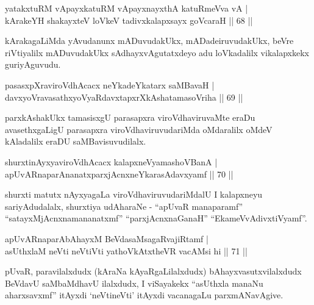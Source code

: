 \begin{shl}
yatakxtuRM vA\s payxkatuRM vA\s payxnayxthA katuRmeVva vA  | \\
kArakeYH shakayxteV loVkeV tadivxkalapxsayx goVcaraH  \hfill||  68 ||  
\end{shl}

\begin{artha}
kArakagaLiMda yAvudanunx mADuvudakUkx, mADadeiruvudakUkx, beVre riVtiyalilx mADuvudakUkx sAdhayxvAgutatxdeyo adu loVkadalilx vikalapxkekx guriyAguvudu.
\end{artha}


\begin{shl}
pasasxpXraviroVdhAcacx neYkadeYkatarx saMBavaH  | \\
davxyoVravasathxyoVyaRdavxtapxrXkAshatamasoVriha \hfill ||  69 ||  
\end{shl}

\begin{artha}
parxkAshakUkx tamasisxgU parasapxra viroVdhaviruvaMte eraDu avasethxgaLigU parasapxra viroVdhaviruvudariMda oMdaralilx oMdeV kAladalilx eraDU saMBavisuvudilalx.
\end{artha}

\begin{shl}
shurxtinAyxyaviroVdhAcacx kalapxneVyamashoVBanA  | \\
apUvARnaparAnanatxparxjAcnxneYkarasAdavxyamf \hfill||  70 ||  
\end{shl}

\begin{artha}
shurxti matutx nAyxyagaLa viroVdhaviruvudariMdalU I kalapxneyu sariyAdudalalx, shurxtiya udAharaNe - ``apUvaR manaparamf'' ``satayxMjAcnxnamananatxmf'' ``parxjAcnxnaGanaH'' ``EkameVvAdivxtiVyamf''. 
\end{artha}


\begin{shl}
apUvARnaparAbAhayxM BeVdasaMsagaRvajiRtamf  | \\
asUthxlaM neVti neVtiVti yathoVkAtxtheVR vacAMsi hi \hfill||  71 ||  
\end{shl}

\begin{artha}
pUvaR, paravilalxdudx (kAraNa kAyaRgaLilalxdudx) bAhayxvasutxvilalxdudx BeVdavU saMbaMdhavU ilalxdudx, I viSayakekx ``asUthxla manaNu aharxsavxmf'' itAyxdi `neVtineVti' itAyxdi vacanagaLu parxmANavAgive.
\end{artha}

